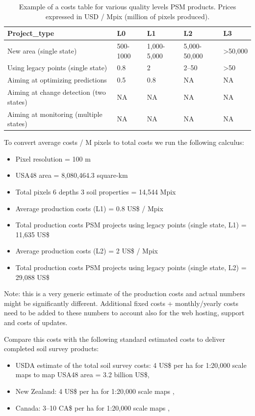 \documentclass[graybox,natbib,nospthms,UStrade]{svmono}
\begin{document}
\begin{table}[t]

\caption{\label{tab:psm-table-costs}Example of a costs table for various quality levels PSM products. Prices expressed in USD / Mpix (million of pixels produced).}
\centering
\begin{tabular}{lllll}
\toprule
Project\_type & L0 & L1 & L2 & L3\\
\midrule
New area (single state) & 500-1000 & 1,000-5,000 & 5,000-50,000 & >50,000\\
Using legacy points (single state) & 0.8 & 2 & 2–50 & >50\\
Aiming at optimizing predictions & 0.5 & 0.8 & NA & NA\\
Aiming at change detection (two states) & NA & NA & NA & NA\\
Aiming at monitoring (multiple states) & NA & NA & NA & NA\\
\bottomrule
\end{tabular}
\end{table}

To convert average costs / M pixels to total costs we run the following
calculus:

\begin{itemize}
\item
  Pixel resolution = 100 m
\item
  USA48 area = 8,080,464.3 square-km
\item
  Total pixels 6 depths 3 soil properties = 14,544 Mpix
\item
  Average production costs (L1) = 0.8 US\$ / Mpix
\item
  Total production costs PSM projects using legacy points (single state,
  L1) = 11,635 US\$
\item
  Average production costs (L2) = 2 US\$ / Mpix
\item
  Total production costs PSM projects using legacy points (single state,
  L2) = 29,088 US\$
\end{itemize}

Note: this is a very generic estimate of the production costs and actual
numbers might be significantly different. Additional fixed costs +
monthly/yearly costs need to be added to these numbers to account also
for the web hosting, support and costs of updates.

Compare this costs with the following standard estimated costs to
deliver completed soil survey products:

\begin{itemize}
\item
  USDA estimate of the total soil survey costs: 4 US\$ per ha for
  1:20,000 scale maps \citep{Durana2008} to map USA48 area = 3.2 billion
  US\$,
\item
  New Zealand: 4 US\$ per ha for 1:20,000 scale maps \citep{Carrick2010WCSS},
\item
  Canada: 3--10 CA\$ per ha for 1:20,000 scale maps \citep{MacMillan2010DSM},
\end{itemize}
\end{document}
